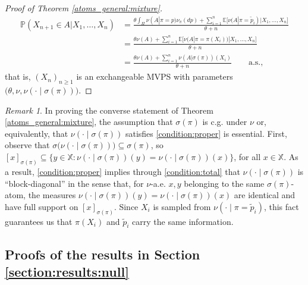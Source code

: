 \documentclass[a4paper]{article}
\theoremstyle{plain}
\theoremstyle{remark}
\newtheorem{remark}[theorem]{Remark}
\theoremstyle{definition}
\begin{document}
\begin{proof}[Proof of Theorem \ref{atoms_general:mixture}]
\begingroup\allowdisplaybreaks
\begin{align*}
\mathbb{P}(X_{n+1}\in A|X_1,\ldots,X_n)&=\frac{\theta\int_\Pi\nu(A|\pi=p)\nu_{\pi}(dp)+\sum_{i=1}^n\mathbb{E}\bigl[\nu(A|\pi=\tilde{p}_i)|X_1,\ldots,X_n\bigr]}{\theta+n}\\
&=\frac{\theta\nu(A)+\sum_{i=1}^n\mathbb{E}\bigl[\nu(A|\pi=\pi(X_i))|X_1,\ldots,X_n\bigr]}{\theta+n}\\
&=\frac{\theta\nu(A)+\sum_{i=1}^n\nu(A|\sigma(\pi))(X_i)}{\theta+n}\qquad\mbox{a.s.},
\end{align*}
\endgroup
that is, $(X_n)_{n\geq1}$ is an exchangeable MVPS with parameters $\bigl(\theta,\nu,\nu(\cdot\mid\sigma(\pi))\bigr)$.
\end{proof}

\begin{remark}\label{atoms_general:mixture:proof:remark}
In proving the converse statement of Theorem \ref{atoms_general:mixture}, the assumption that $\sigma(\pi)$ is c.g. under $\nu$ or, equivalently, that $\nu(\cdot\mid\sigma(\pi))$ satisfies \eqref{condition:proper} is essential. First, observe that $\sigma\bigl(\nu(\cdot\mid\sigma(\pi))\bigr)\subseteq\sigma(\pi)$, so $[x]_{\sigma(\pi)}\subseteq\bigl\{y\in\mathbb{X}:\nu(\cdot\mid\sigma(\pi))(y)=\nu(\cdot\mid\sigma(\pi))(x)\bigr\}$, for all $x\in\mathbb{X}$. As a result, \eqref{condition:proper} implies through \eqref{condition:total} that $\nu(\cdot\mid\sigma(\pi))$ is ``block-diagonal'' in the sense that, for $\nu$-a.e. $x,y$ belonging to the same $\sigma(\pi)$-atom, the measures $\nu(\cdot\mid\sigma(\pi))(y)=\nu(\cdot\mid\sigma(\pi))(x)$ are identical and have full support on $[x]_{\sigma(\pi)}$. Since $X_i$ is sampled from $\nu(\cdot\mid\pi=\tilde{p}_i)$, this fact guarantees us that $\pi(X_i)$ and $\tilde{p}_i$ carry the same information.
\end{remark}

\subsection{Proofs of the results in Section \ref{section:results:null}}
\end{document}
